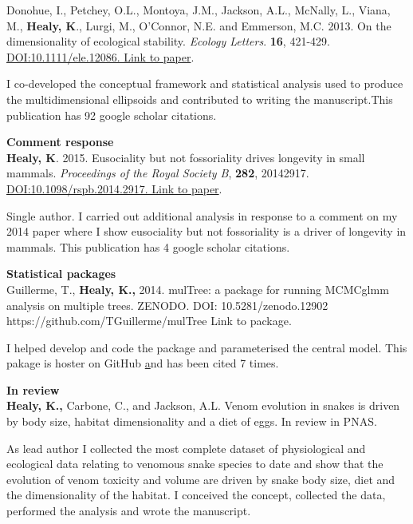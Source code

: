 \documentclass[10pt,a4paper]{article}
\begin{document}
\begin{flushleft}
\bigskip

\setlength{\parindent}{0mm}Donohue, I., Petchey, O.L., Montoya, J.M., Jackson, A.L., McNally, L., Viana, M., \textbf{Healy, K}., Lurgi, M., O’Connor, N.E. and Emmerson, M.C. 2013. On the dimensionality of ecological stability. \textit{Ecology Letters}. \textbf{16}, 421-429. \href{http://onlinelibrary.wiley.com/doi/10.1111/ele.12086/abstract} {DOI:10.1111/ele.12086. Link to paper}. 
\smallskip
\par{\fontsize{10.5}{10} I co-developed the conceptual framework and statistical analysis used to produce the multidimensional ellipsoids and contributed to writing the manuscript.This publication has 92 google scholar citations.}
\bigskip


\textbf{Comment response}\\
\setlength{\parindent}{0mm}\textbf{Healy, K}. 2015.  Eusociality but not fossoriality drives longevity in small mammals. \textit{Proceedings of the Royal Society B}, \textbf{282}, 20142917. \href{http://rspb.royalsocietypublishing.org/content/282/1806/20142917} {DOI:10.1098/rspb.2014.2917. Link to paper}. 
\smallskip
\par{\fontsize{10.5}{10} Single author. I carried out additional analysis in response to a comment on my 2014 paper where I show eusociality but not fossoriality is a driver of longevity in mammals. This publication has 4 google scholar citations.}


\textbf{Statistical packages}\\
\setlength{\parindent}{0mm} Guillerme, T., \textbf{Healy, K.,} 2014. mulTree: a package for running MCMCglmm analysis on multiple trees. ZENODO. DOI: 10.5281/zenodo.12902 {https://github.com/TGuillerme/mulTree Link to package}.
\smallskip
\par{\fontsize{10.5}{10} I helped develop and code the package and parameterised the central model. This pakage is hoster on GitHub \href{https://github.com/TGuillerme/mulTree} and has been cited 7 times.}

\bigskip

\textbf{In review}\\

\setlength{\parindent}{0mm}\textbf{Healy, K.,} Carbone, C., and Jackson, A.L. Venom evolution in snakes is driven by body size, habitat dimensionality and a diet of eggs. In review in PNAS.
\smallskip
\par{\fontsize{10.5}{10} As lead author I collected the most complete dataset of physiological and ecological data relating to venomous snake species to date and show that the evolution of venom toxicity and volume are driven by snake body size, diet and the dimensionality of the habitat. I conceived the concept, collected the data, performed the analysis and wrote the manuscript.}
\smallskip


\end{flushleft}
\end{document}
